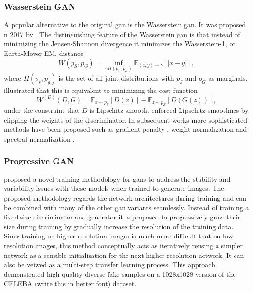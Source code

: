 
\subsubsection{Wasserstein GAN}
A popular alternative to the original \acrshort{gan} is the Wasserstein \acrshort{gan}. It was proposed n 2017 by \textcite{arjovsky2017wasserstein}. The distinguishing feature of the Wasserstein \acrshort{gan} is that instead of minimizing the Jensen-Shannon divergence it minimizes the Wasserstein-1, or Earth-Mover EM, distance 
\begin{equation}
    W(p_S, p_G) = \inf_{\gamma \Pi (p_S, p_G)} \mathbb{E}_{(x, y) \sim \gamma} \left[|x-y|\right],
\end{equation}
where $\Pi(p_s, p_g)$ is the set of all joint distributions with $p_S$ and $p_G$ as marginals. \textcite{arjovsky2017wasserstein} illustrated that this is equivalent to minimizing the cost function
\begin{equation}
    W^{(D)}(D, G) = \mathbb{E}_{x\sim p_S}[D(x)] - \mathbb{E}_{z \sim p_Z}[D(G(z))],
\end{equation}
under the constraint that $D$ is Lipschitz smooth. \textcite{arjovsky2017wasserstein} enforced Lipschitz smoothnes by clipping the weights of the discriminator. In subsequent works more sophisticated methods have been proposed such as gradient penalty \parencite{gulrajani2017improved}, weight normalization \parencite{NIPS2016weightnorm} and spectral normalization \parencite{miyato2017spectral}.

\subsubsection{Progressive GAN}
\textcite{karras2017progressive} proposed a novel training methodology for \acrshort{gans} to address the stability and variability issues with these models when trained to generate images. The proposed methodology regards the network architectures during training and can be combined with many of the other \acrshort{gan} variants seamlessly. Instead of training a fixed-size discriminator and generator it is proposed to progressively grow their size during training by gradually increase the resolution of the training data. Since training on higher resolution images is much more difficult that on low resolution images, this method conceptually acts as iteratively reusing a simpler network as a sensible initialization for the next higher-resolution network. It can also be veiwed as a multi-step transfer learning process. This approach demonstrated high-quality diverse fake samples on a 1028x1028 version of the CELEBA (write this in better font) dataset. 

